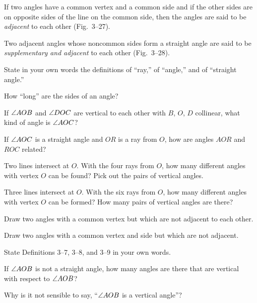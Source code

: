 \documentclass[11pt]{book}
\theoremstyle{bkplain}
\begin{document}
\FIGIIITWENTYSIX

\begin{definition}
If two angles have a common vertex and a common side and if the other sides are
on opposite sides of the line on the common side, then the angles are said to be
\emph{adjacent} to each other (Fig.~3--27).
\end{definition}

\FIGIIITWENTYSEVEN

\begin{definition}
Two adjacent angles whose noncommon sides form a straight angle are said to be
\emph{supplementary and adjacent} to each other (Fig.~3--28).
\end{definition}

\FIGIIITWENTYEIGHT

\begin{exercisecols}
\begin{exlist}
\item State in your own words the definitions of ``ray,'' of ``angle,'' and of
      ``straight angle.''
\item How ``long'' are the sides of an angle?
\item If $\angle AOB$ and $\angle DOC$ are vertical to each other with $B$, $O$,
      $D$ collinear, what kind of angle is $\angle AOC$?
\item If $\angle AOC$ is a straight angle and $OR$ is a ray from $O$, how are
      angles $AOR$ and $ROC$ related?
\item Two lines intersect at $O$. With the four rays from $O$, how many different
      angles with vertex $O$ can be found? Pick out the pairs of vertical angles.
\item Three lines intersect at $O$. With the six rays from $O$, how many
      different angles with vertex $O$ can be formed? How many pairs of vertical
      angles are there?
\item Draw two angles with a common vertex but which are not adjacent to each
      other.
\item Draw two angles with a common vertex and side but which are not adjacent.
\item State Definitions 3--7, 3--8, and 3--9 in your own words.
\item If $\angle AOB$ is not a straight angle, how many angles are there that are
      vertical with respect to $\angle AOB$?
\item Why is it not sensible to say, ``$\angle AOB$ is a vertical angle''?
\end{exlist}
\end{exercisecols}
\end{document}
